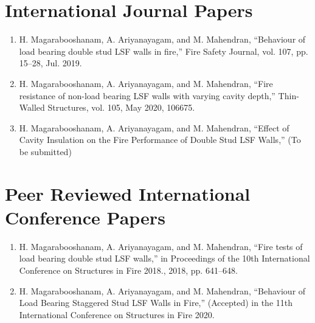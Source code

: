 \section*{International Journal Papers}

\begin{enumerate}
    \item H. Magarabooshanam, A. Ariyanayagam, and M. Mahendran, “Behaviour of load bearing double stud LSF walls in fire,” Fire Safety Journal, vol. 107, pp. 15–28, Jul. 2019.
    \item H. Magarabooshanam, A. Ariyanayagam, and M. Mahendran, “Fire resistance of non-load bearing LSF walls with varying cavity depth,” Thin-Walled Structures, vol. 105, May 2020, 106675.
    \item  H. Magarabooshanam, A. Ariyanayagam, and M. Mahendran, “Effect of Cavity Insulation on the Fire Performance of Double Stud
    LSF Walls,” (To be submitted)
\end{enumerate}

\section*{Peer Reviewed International Conference Papers}

\begin{enumerate}
    \item H. Magarabooshanam, A. Ariyanayagam, and M. Mahendran, “Fire tests of load bearing double stud LSF walls,” in Proceedings of the 10th International Conference on Structures in Fire 2018., 2018, pp. 641–648.
    \item H. Magarabooshanam, A. Ariyanayagam, and M. Mahendran, “Behaviour of Load Bearing Staggered Stud LSF Walls in Fire,” (Accepted) in the 11th International Conference on Structures in Fire 2020.
\end{enumerate}